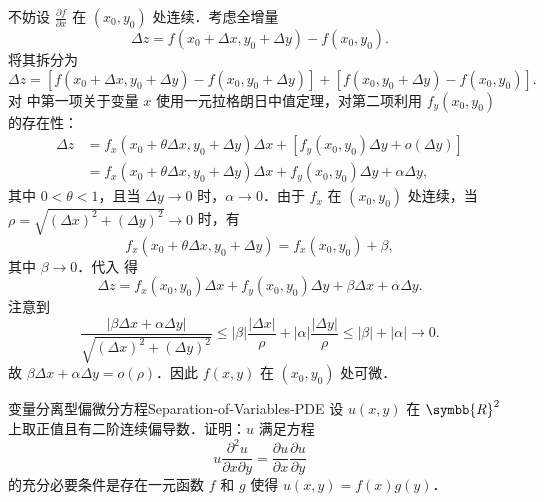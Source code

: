 \begin{myproof}
    不妨设 $\frac{\partial f}{\partial x}$ 在 $(x_0, y_0)$ 处连续．考虑全增量
    \begin{equation}
        \Delta z = f(x_0 + \Delta x, y_0 + \Delta y) - f(x_0, y_0).
        \label{eq:diff-def-1}
    \end{equation}
    将其拆分为
    \begin{equation}
        \Delta z = [f(x_0 + \Delta x, y_0 + \Delta y) - f(x_0, y_0 + \Delta y)] + [f(x_0, y_0 + \Delta y) - f(x_0, y_0)].
        \label{eq:increment-split}
    \end{equation}
    对  中第一项关于变量 $x$ 使用一元拉格朗日中值定理，对第二项利用 $f_y(x_0, y_0)$ 的存在性：
    \begin{equation}
        \begin{aligned}
            \Delta z & = f_x(x_0 + \theta \Delta x, y_0 + \Delta y) \Delta x + [f_y(x_0, y_0) \Delta y + o(\Delta y)]    \\
                     & = f_x(x_0 + \theta \Delta x, y_0 + \Delta y) \Delta x + f_y(x_0, y_0) \Delta y + \alpha \Delta y,
        \end{aligned}
        \label{eq:mvt-apply}
    \end{equation}
    其中 $0 < \theta < 1$，且当 $\Delta y \to 0$ 时，$\alpha \to 0$．由于 $f_x$ 在 $(x_0, y_0)$ 处连续，当 $\rho = \sqrt{(\Delta x)^2 + (\Delta y)^2} \to 0$ 时，有
    \begin{equation}
        f_x(x_0 + \theta \Delta x, y_0 + \Delta y) = f_x(x_0, y_0) + \beta,
        \label{eq:fx-cont}
    \end{equation}
    其中 $\beta \to 0$．代入  得
    \begin{equation}
        \Delta z = f_x(x_0, y_0) \Delta x + f_y(x_0, y_0) \Delta y + \beta \Delta x + \alpha \Delta y.
        \label{eq:final-form}
    \end{equation}
    注意到
    \begin{equation}
        \frac{|\beta \Delta x + \alpha \Delta y|}{\sqrt{(\Delta x)^2 + (\Delta y)^2}} \le |\beta| \frac{|\Delta x|}{\rho} + |\alpha| \frac{|\Delta y|}{\rho} \le |\beta| + |\alpha| \to 0.
        \label{eq:limit-zero}
    \end{equation}
    故 $\beta \Delta x + \alpha \Delta y = o(\rho)$．因此 $f(x, y)$ 在 $(x_0, y_0)$ 处可微．
\end{myproof}

\begin{problem}{变量分离型偏微分方程}{Separation-of-Variables-PDE}
    设 $u(x, y)$ 在 $\symbb{R}^2$ 上取正值且有二阶连续偏导数．证明：$u$ 满足方程
    \begin{equation}
        u \frac{\partial^2 u}{\partial x \partial y} = \frac{\partial u}{\partial x} \frac{\partial u}{\partial y}
        \label{eq:pde-origin}
    \end{equation}
    的充分必要条件是存在一元函数 $f$ 和 $g$ 使得 $u(x, y) = f(x)g(y)$．
\end{problem}

